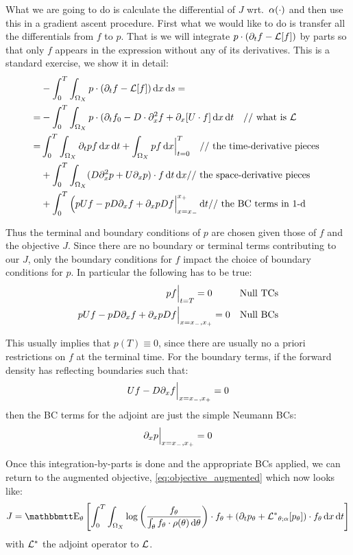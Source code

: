 \documentclass{article}
\begin{document}
What we are going to do is calculate the differential of $J$ wrt.\ ${\alpha}(\cdot)$
and then use this in a gradient ascent procedure. First what we would like to do
is transfer all the differentials from $f$ to $p$. That is we will integrate $p
\cdot ({\partial}_t f - { \mathcal{L} }[f])$ by parts so that only $f$ appears in the expression
without any of its derivatives. This is a standard exercise, we show it in
detail:
\begin{align*}
&-\int_0^T \int_{{\Omega}_X} p \cdot ({\partial}_t f - { \mathcal{L} }[f]) \, \mathrm{d} x \, \mathrm{d} s=
\\
=&-\int_0^T \int_{{\Omega}_X} p \cdot 
({\partial}_t f_0 - D \cdot {\partial}_x^2 f + {\partial}_x [U \cdot f]
\, \mathrm{d} x \, \mathrm{d} t \quad \textrm{// what is }{ \mathcal{L} }
\\
=&
 \int_0^T\int_{{\Omega}_X} {\partial}_t p  f \, \mathrm{d} x \, \mathrm{d} t +
  \int_{{\Omega}_X} p f\, \mathrm{d} x  \Big|^{T}_{t=0} \quad \textrm{// the time-derivative pieces }
  \\
  &+ \int_0^T \int_{{\Omega}_X}
	    (D {\partial}^2_x p + U {\partial}_x p)\cdot f 
	  \, \mathrm{d} t\, \mathrm{d} x  \textrm{// the space-derivative pieces }
	  \\
	  &+ \int_0^T 
	   \Big( p U f - p D {\partial}_xf + {\partial}_x p D f \Big|_{x={ x_{-} }}^{{ x_{+} }} 
	  \, \mathrm{d} t
	   \textrm{// the BC terms in 1-d}
\end{align*}

Thus the terminal and boundary conditions of $p$ are chosen given those of $f$
and the objective $J$. Since there are no boundary or terminal terms
contributing to our $J$, only the boundary conditions for $f$ impact the
choice of boundary conditions for $p$. In particular the following has to be
true:
\begin{align*}
pf&\Big|_{t=T}  = 0 & \textrm{Null TCs} \\
p U f - p D {\partial}_xf + {\partial}_x p D f &\Big|_{x={ x_{-} }, { x_{+} }} = 0 & \textrm{Null BCs}
\end{align*}

This usually implies that $p(T) \equiv 0$, since there are usually no a priori
restrictions on $f$ at the terminal time. For the boundary terms, 
if the forward density has reflecting boundaries such that:
$$
U f - D{\partial}_x f\Big|_{x={ x_{-} }, { x_{+} }}  = 0
$$
then the BC terms for the adjoint are just the simple Neumann BCs:
$$
{\partial}_x p \Big|_{x={ x_{-} }, { x_{+} }} = 0
$$

Once this integration-by-parts is done and the appropriate BCs applied, we
can return to the augmented objective, \cref{eq:objective_augmented} which now
looks like:
\begin{equation}
J =  \Exp_\th
\left[ \int_0^T\int_{\O_X} \log\left(\frac{f_\th}
 					{\int_\th f_\th \cdot \rho(\th)\intd{\th}}\right) 
 			 \cdot f_\th 
 			 + 
 			 (\di_t p_\th + \Lstar_{\th;\a}[p_\th] ) \cdot f_\th
\intd{x}
\intd{t} \right]
\label{eq:objective_augmented_adjoined}
\end{equation}
with ${ { \mathcal{L} }^* }$ the adjoint operator to ${ \mathcal{L} }$.
\end{document}
